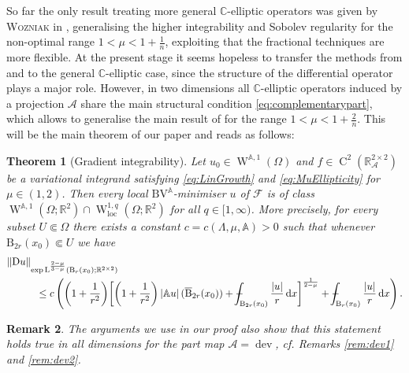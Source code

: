 \documentclass[a4paper,10pt,reqno,oneside]{amsart}
\numberwithin{equation}{section}
\newcommand{\R}{\mathbb R}
\newcommand{\C}{\mathbb C}
\newcommand{\ball}{\mathrm{B}}
\newcommand{\A}{\mathscr{A}}
\newcommand{\Aop}{\mathbb{A}}
\newcommand{\lebe}{\operatorname{L}}
\newcommand{\sobo}{\operatorname{W}}
\newcommand{\hold}{\operatorname{C}}
\newcommand{\BV}{\mathrm{BV}}
\newcommand{\loc}{\mathrm{loc}}
\newcommand{\D}{\mathrm{D}}
\newcommand{\dev}{\operatorname{dev}}
\newcommand{\dx}[1]{\,\mathrm{d}#1}
\newcommand{\abs}[1]{\left\lvert#1\right\rvert}
\newcommand{\F}{\mathscr{F}}
\def\Xint#1{\mathchoice
	{\XXint\displaystyle\textstyle{#1}}%
	{\XXint\textstyle\scriptstyle{#1}}%
	{\XXint\scriptstyle\scriptscriptstyle{#1}}%
	{\XXint\scriptscriptstyle\scriptscriptstyle{#1}}%
	\!\int}
\def\XXint#1#2#3{{\setbox0=\hbox{$#1{#2#3}{\int}$ }
		\vcenter{\hbox{$#2#3$ }}\kern-.6\wd0}}
\def\dashint{\Xint-}
\newtheorem{thm}{Theorem}[section]
\newtheorem{rem}[thm]{Remark}
\begin{document}
 So far the only result treating more general $\C$-elliptic operators was given by \textsc{Wozniak} in \cite{Piotr}, generalising the higher integrability and Sobolev regularity for the non-optimal range $1<\mu<1+\frac{1}{n}$, exploiting that the fractional techniques are more flexible. At the present stage it seems hopeless to transfer the methods from \cite{Gmeineder} and \cite{BEG} to the general $\C$-elliptic case, since the structure of the differential operator plays a major role. However, in two dimensions all $\C$-elliptic operators induced by a projection $\A$ share the main structural condition \eqref{eq:complementarypart}, which allows to generalise the main result of \cite{Gmeineder} for the range $1<\mu<1+\frac{2}{n}$. This will be the main theorem of our paper and reads as follows:
 \begin{thm}[Gradient integrability]\label{thm:MainTheorem}
 	Let $u_0\in \sobo^{\Aop,1}(\Omega)$ and $f\in\hold^2(\R^{2\times 2}_\A)$ be  a variational integrand satisfying \eqref{eq:LinGrowth} and \eqref{eq:MuEllipticity} for $\mu\in(1,2)$. Then every local $\BV^\Aop$-minimiser $u$ of $\F$ is of class $\sobo^{\Aop,1}(\Omega;\R^2)\cap \sobo^{1,q}_\loc(\Omega;\R^2)$ for all $q\in[1,\infty)$. More precisely, for every subset $U\Subset \Omega$ there exists a constant $c=c(\Lambda,\mu,\Aop)>0$ such that whenever $\ball_{2r}(x_0)\Subset U$ we have 
 	\begin{align}\label{eq:FinalEstimateMainTheorem}
 		\begin{split}
 		&\|\D u\|_{\exp\lebe^{\frac{2-\mu}{3-\mu}}(\ball_{r}(x_0); \R^{2\times 2})} \\
 		&\hspace{1cm}\leq c \left(\bigg(1+\frac{1}{r^2}\bigg)\bigg[\bigg(1+\frac{1}{r^2}\bigg) \abs{\Aop u}(\overline{\ball}_{2r}(x_0)) + \dashint_{\ball_{2r}(x_0)} \frac{\abs{u}}{r} \dx{x}\bigg]^{\frac{1}{2-\mu}} + \dashint_{\ball_{r}(x_0)} \frac{\abs{u}}{r}\dx{x}\right).
 		\end{split}
 	\end{align}
 \end{thm}
 \begin{rem}
 	The arguments we use in our proof also show that this statement holds true in \emph{all} dimensions for the part map $\A=\dev$, cf. Remarks \ref{rem:dev1} and \ref{rem:dev2}.
 \end{rem}
\end{document}

